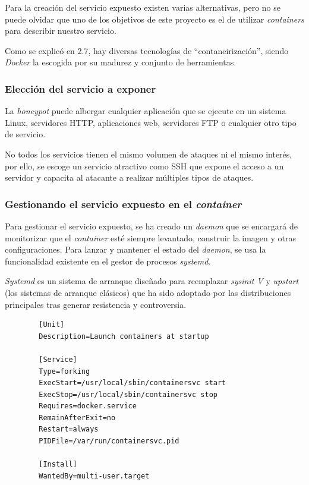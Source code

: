 Para la creación del servicio expuesto existen varias alternativas, pero no se puede olvidar que uno de los objetivos de este proyecto es el de utilizar \emph{containers} para describir nuestro servicio.

Como se explicó en 2.7, hay diversas tecnologías de ``contaneirización'', siendo \emph{Docker} la escogida por su madurez y conjunto de herramientas. 

\subsubsection{Elección del servicio a exponer}

La \emph{honeypot} puede albergar cualquier aplicación que se ejecute en un sistema Linux, servidores HTTP, aplicaciones
web, servidores FTP o cualquier otro tipo de servicio.

No todos los servicios tienen el mismo volumen de ataques ni el mismo interés, por ello, se escoge un servicio atractivo como SSH que 
expone el acceso a un servidor y capacita al atacante a realizar múltiples tipos de ataques.

\subsubsection{Gestionando el servicio expuesto en el \emph{container}}

Para gestionar el servicio expuesto, se ha creado un \emph{daemon} que se encargará de monitorizar que el \emph{container} esté siempre levantado, construir
la imagen y otras configuraciones. Para lanzar y mantener el estado del \emph{daemon}, se usa la funcionalidad existente en el gestor de procesos \emph{systemd}.

\emph{Systemd} es un sistema de arranque diseñado para reemplazar \emph{sysinit V} y \emph{upstart} (los sistemas de arranque clásicos) que ha sido adoptado
por las distribuciones principales tras generar resistencia y controversia.

    \begin{verbatim}
        [Unit]
        Description=Launch containers at startup
        
        [Service]
        Type=forking
        ExecStart=/usr/local/sbin/containersvc start
        ExecStop=/usr/local/sbin/containersvc stop
        Requires=docker.service
        RemainAfterExit=no
        Restart=always
        PIDFile=/var/run/containersvc.pid
        
        [Install]
        WantedBy=multi-user.target
    \end{verbatim}

